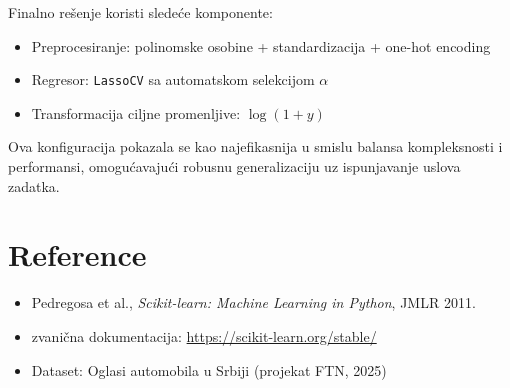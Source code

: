 \documentclass[a4paper,12pt]{article}
\begin{document}
Finalno rešenje koristi sledeće komponente:
\begin{itemize}
    \item Preprocesiranje: polinomske osobine + standardizacija + one-hot encoding
    \item Regresor: \texttt{LassoCV} sa automatskom selekcijom $\alpha$
    \item Transformacija ciljne promenljive: $\log(1 + y)$
\end{itemize}

Ova konfiguracija pokazala se kao najefikasnija u smislu balansa kompleksnosti i performansi, omogućavajući robusnu generalizaciju uz ispunjavanje uslova zadatka.

\section*{Reference}

\begin{itemize}
    \item Pedregosa et al., \textit{Scikit-learn: Machine Learning in Python}, JMLR 2011.
    \item zvanična dokumentacija: \url{https://scikit-learn.org/stable/}
    \item Dataset: Oglasi automobila u Srbiji (projekat FTN, 2025)
\end{itemize}
\end{document}
